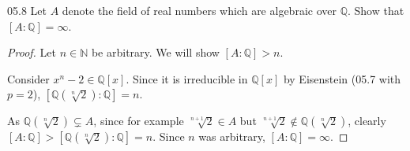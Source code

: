 \documentclass[11pt]{article}
\begin{document}
\begin{problem}{05.8}
  Let $A$ denote the field of real numbers which are algebraic over
  $\mathbb{Q}$. Show that $[A : \mathbb{Q}] = \infty$.
\end{problem}
\begin{proof}
Let $n \in \mathbb{N}$ be arbitrary. We will show $[A : \mathbb{Q}] > n$.

Consider $x^n - 2 \in \mathbb{Q}[x]$. Since it is irreducible in
$\mathbb{Q}[x]$ by Eisenstein (05.7 with $p = 2$),
$[\mathbb{Q}(\sqrt[n]{2}) : \mathbb{Q}] = n$.

As $\mathbb{Q}(\sqrt[n]{2}) \subsetneq A$, since for example
$\sqrt[n+1]{2} \in A$ but $\sqrt[n+1]{2} \notin \mathbb{Q}(\sqrt[n]{2})$,
clearly $[A : \mathbb{Q}] > [\mathbb{Q}(\sqrt[n]{2}) : \mathbb{Q}] = n$.
Since $n$ was arbitrary, $[A : \mathbb{Q}] = \infty$.
\end{proof}
\end{document}
